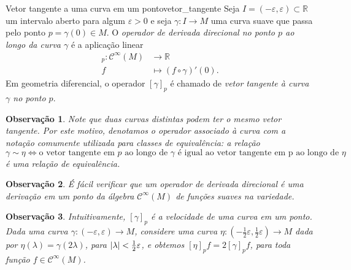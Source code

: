 \documentclass[12pt,a4paper]{article}
\numberwithin{equation}{section}
\DeclarePairedDelimiter\abs{\lvert}{\rvert}
\newcommand\smooth[1]{\ensuremath{\mathcal{C}^\infty(#1)}}
\newtheorem{remark}{Observação}[section]
\begin{document}
\begin{definition}{Vetor tangente a uma curva em um ponto}{vetor_tangente}
    Seja \(I = (-\varepsilon, \varepsilon) \subset \mathbb{R}\) um intervalo aberto para algum \(\varepsilon > 0\) e seja \(\gamma : I \to M\) uma curva suave que passa pelo ponto \(p = \gamma(0) \in M\). O \emph{operador de derivada direcional no ponto \(p\) ao longo da curva \(\gamma\)} é a aplicação linear
    \begin{align*}
        [\gamma]_p : \smooth{M} &\to \mathbb{R}\\
                              f &\mapsto (f \circ \gamma)'(0).
    \end{align*}
    Em geometria diferencial, o operador \([\gamma]_p\) é chamado de \emph{vetor tangente à curva \(\gamma\) no ponto \(p\)}.
\end{definition}
\begin{remark}
    Note que duas curvas distintas podem ter o mesmo vetor tangente. Por este motivo, denotamos o operador associado à curva com a notação comumente utilizada para classes de equivalência: a relação
    \begin{equation*}
        \gamma \sim \eta \iff \text{o vetor tangente em \(p\) ao longo de \(\gamma\) é igual ao vetor tangente em p ao longo de \(\eta\)}
    \end{equation*}
    é uma relação de equivalência.
\end{remark}
\begin{remark}
    É fácil verificar que um operador de derivada direcional é uma derivação em um ponto da álgebra \smooth{M} de funções suaves na variedade.
\end{remark}
\begin{remark}
    Intuitivamente, \([\gamma]_p\) é a velocidade de uma curva em um ponto. Dada uma curva \(\gamma : (-\varepsilon,\varepsilon) \to M\), considere uma curva \(\eta : \left(-\frac12 \varepsilon, \frac12 \varepsilon\right) \to M\) dada por \(\eta(\lambda) = \gamma(2 \lambda)\), para \(\abs\lambda < \frac12 \varepsilon\), e obtemos \([\eta]_pf = 2[\gamma]_p f\), para toda função \(f \in \smooth{M}\).
\end{remark}
\end{document}
